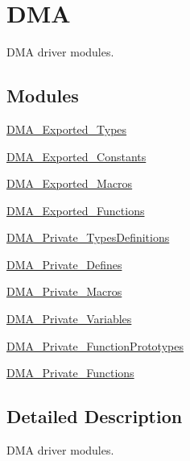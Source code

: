 \hypertarget{group___d_m_a}{}\section{D\+MA}
\label{group___d_m_a}


D\+MA driver modules.  


\subsection*{Modules}
\begin{DoxyCompactItemize}
\item 
\hyperlink{group___d_m_a___exported___types}{D\+M\+A\+\_\+\+Exported\+\_\+\+Types}
\item 
\hyperlink{group___d_m_a___exported___constants}{D\+M\+A\+\_\+\+Exported\+\_\+\+Constants}
\item 
\hyperlink{group___d_m_a___exported___macros}{D\+M\+A\+\_\+\+Exported\+\_\+\+Macros}
\item 
\hyperlink{group___d_m_a___exported___functions}{D\+M\+A\+\_\+\+Exported\+\_\+\+Functions}
\item 
\hyperlink{group___d_m_a___private___types_definitions}{D\+M\+A\+\_\+\+Private\+\_\+\+Types\+Definitions}
\item 
\hyperlink{group___d_m_a___private___defines}{D\+M\+A\+\_\+\+Private\+\_\+\+Defines}
\item 
\hyperlink{group___d_m_a___private___macros}{D\+M\+A\+\_\+\+Private\+\_\+\+Macros}
\item 
\hyperlink{group___d_m_a___private___variables}{D\+M\+A\+\_\+\+Private\+\_\+\+Variables}
\item 
\hyperlink{group___d_m_a___private___function_prototypes}{D\+M\+A\+\_\+\+Private\+\_\+\+Function\+Prototypes}
\item 
\hyperlink{group___d_m_a___private___functions}{D\+M\+A\+\_\+\+Private\+\_\+\+Functions}
\end{DoxyCompactItemize}


\subsection{Detailed Description}
D\+MA driver modules. 

